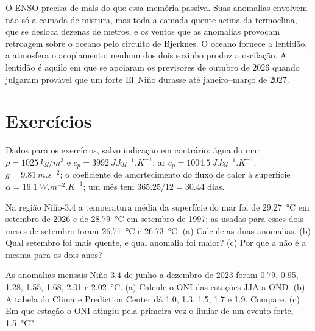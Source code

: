 O ENSO precisa de mais do que essa memória passiva. Suas anomalias envolvem não só a camada de mistura, mas
toda a camada quente acima da termoclina, que se desloca dezenas de metros, e os ventos que as
anomalias provocam retroagem sobre o oceano pelo circuito de Bjerknes. O oceano fornece a lentidão,
a atmosfera o acoplamento; nenhum dos dois sozinho produz a oscilação. A lentidão é aquilo em que se apoiaram os
previsores de outubro de 2026 quando julgaram provável que um forte El~Niño durasse até
janeiro--março de 2027.

\section*{Exercícios}\label{sec:b2:climate-variability:exercises}

Dados para os exercícios, salvo indicação em contrário: água do mar $\rho = \qty{1025}{kg/m^3}$ e $c_p =
\qty{3992}{J.kg^{-1}.K^{-1}}$; ar $c_p = \qty{1004.5}{J.kg^{-1}.K^{-1}}$; $g =
\qty{9.81}{m.s^{-2}}$; o coeficiente de amortecimento do fluxo de calor à superfície $\alpha =
\qty{16.1}{W.m^{-2}.K^{-1}}$; um mês tem $365.25/12 = 30.44$ dias.

\begin{exercise}[$\star$]\label{exo:b2:climate-variability:1}
Na região Niño-3.4 a temperatura média da superfície do mar foi de \qty{29.27}{\celsius} em setembro de
2026 e de \qty{28.79}{\celsius} em setembro de 1997; as  usadas para esses dois meses de setembro
foram \qty{26.71}{\celsius} e \qty{26.73}{\celsius}. (a) Calcule as duas anomalias. (b) Qual
setembro foi mais quente, e qual anomalia foi maior? (c) Por que a  não é a mesma para os
dois anos?
\end{exercise}

\begin{exercise}[$\star$]\label{exo:b2:climate-variability:2}
As anomalias mensais Niño-3.4 de junho a dezembro de 2023 foram 0.79, 0.95, 1.28, 1.55, 1.68, 2.01
e \qty{2.02}{\celsius}. (a) Calcule o ONI das estações JJA a OND. (b) A tabela do
Climate Prediction Center dá 1.0, 1.3, 1.5, 1.7 e 1.9. Compare. (c) Em que estação o
ONI atingiu pela primeira vez o limiar de um evento forte, \qty{1.5}{\celsius}?
\end{exercise}


